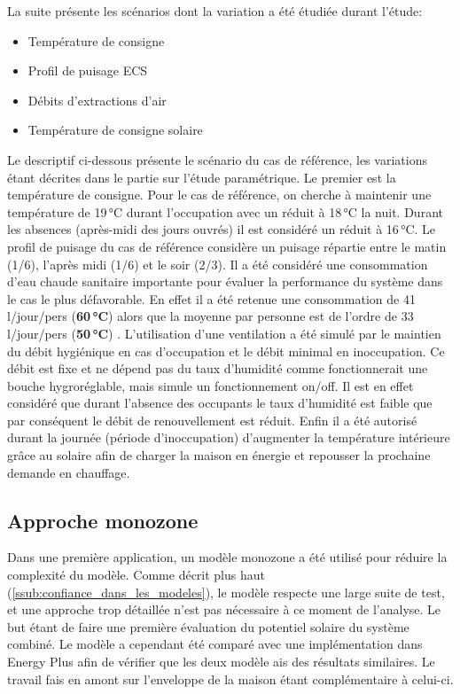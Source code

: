 La suite présente les scénarios dont la variation a été étudiée durant l’étude:
\begin{itemize}
    \item Température de consigne %
    \item Profil de puisage ECS %
    \item Débits d’extractions d’air %
    \item Température de consigne solaire %
\end{itemize} 
Le descriptif ci-dessous présente le scénario du cas de référence, les variations
étant décrites dans le partie sur l’étude paramétrique.
Le premier est la température de consigne. Pour le cas de référence, on cherche à
maintenir une température de 19\,\si{\degreeCelsius} durant l’occupation avec un
réduit à 18\,\si{\degreeCelsius} la nuit. Durant les absences (après-midi des jours ouvrés)
il est considéré un réduit à 16\,\si{\degreeCelsius}.
Le profil de puisage du cas de référence considère un puisage répartie entre le matin (1/6),
l’après midi (1/6) et le soir (2/3). Il a été considéré une consommation d’eau chaude
sanitaire importante pour évaluer la performance du système dans le cas le plus défavorable.
En effet il a été retenue une consommation de 41\,\si{l/jour/pers} (\textbf{60\,\si{\degreeCelsius}}) alors que la
moyenne par personne est de l’ordre de 33\,\si{l/jour/pers} (\textbf{50\,\si{\degreeCelsius}}) .
L’utilisation d’une ventilation a été simulé par le maintien du débit hygiénique
en cas d’occupation et le débit minimal en inoccupation. Ce débit est fixe et ne dépend
pas du taux d’humidité comme fonctionnerait une bouche hygroréglable, mais simule un
fonctionnement on/off. Il est en effet considéré que durant l’absence des occupants
le taux d’humidité est faible que par conséquent le débit de renouvellement est réduit.
Enfin il a été autorisé durant la journée (période d’inoccupation) d’augmenter la température
intérieure grâce au solaire afin de charger la maison en énergie et repousser la 
prochaine demande en chauffage.


\subsection{Approche monozone} %
\label{sub:approche_monozone}
Dans une première application, un modèle monozone a été utilisé pour réduire la
complexité du modèle. Comme décrit plus haut (\autoref{ssub:confiance_dans_les_modeles}),
le modèle respecte une large suite de test, et une approche trop détaillée n’est pas 
nécessaire à ce moment de l’analyse. Le but étant de faire une première évaluation du
potentiel solaire du système combiné.
Le modèle a cependant été comparé avec une implémentation dans Energy Plus afin de
vérifier que les deux modèle ais des résultats similaires. Le travail fais en amont
sur l’enveloppe de la maison étant complémentaire à celui-ci.

